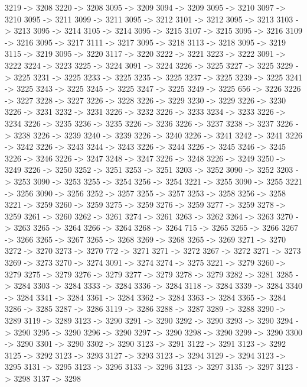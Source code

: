 {	3219 -> 3208
	3220 -> 3208
	3095 -> 3209
	3094 -> 3209
	3095 -> 3210
	3097 -> 3210
	3095 -> 3211
	3099 -> 3211
	3095 -> 3212
	3101 -> 3212
	3095 -> 3213
	3103 -> 3213
	3095 -> 3214
	3105 -> 3214
	3095 -> 3215
	3107 -> 3215
	3095 -> 3216
	3109 -> 3216
	3095 -> 3217
	3111 -> 3217
	3095 -> 3218
	3113 -> 3218
	3095 -> 3219
	3115 -> 3219
	3095 -> 3220
	3117 -> 3220
	3222 -> 3221
	3223 -> 3222
	3091 -> 3222
	3224 -> 3223
	3225 -> 3224
	3091 -> 3224
	3226 -> 3225
	3227 -> 3225
	3229 -> 3225
	3231 -> 3225
	3233 -> 3225
	3235 -> 3225
	3237 -> 3225
	3239 -> 3225
	3241 -> 3225
	3243 -> 3225
	3245 -> 3225
	3247 -> 3225
	3249 -> 3225
	656 -> 3226
	3226 -> 3227
	3228 -> 3227
	3226 -> 3228
	3226 -> 3229
	3230 -> 3229
	3226 -> 3230
	3226 -> 3231
	3232 -> 3231
	3226 -> 3232
	3226 -> 3233
	3234 -> 3233
	3226 -> 3234
	3226 -> 3235
	3236 -> 3235
	3226 -> 3236
	3226 -> 3237
	3238 -> 3237
	3226 -> 3238
	3226 -> 3239
	3240 -> 3239
	3226 -> 3240
	3226 -> 3241
	3242 -> 3241
	3226 -> 3242
	3226 -> 3243
	3244 -> 3243
	3226 -> 3244
	3226 -> 3245
	3246 -> 3245
	3226 -> 3246
	3226 -> 3247
	3248 -> 3247
	3226 -> 3248
	3226 -> 3249
	3250 -> 3249
	3226 -> 3250
	3252 -> 3251
	3253 -> 3251
	3203 -> 3252
	3090 -> 3252
	3203 -> 3253
	3090 -> 3253
	3255 -> 3254
	3256 -> 3254
	3221 -> 3255
	3090 -> 3255
	3221 -> 3256
	3090 -> 3256
	3252 -> 3257
	3255 -> 3257
	3253 -> 3258
	3256 -> 3258
	3221 -> 3259
	3260 -> 3259
	3275 -> 3259
	3276 -> 3259
	3277 -> 3259
	3278 -> 3259
	3261 -> 3260
	3262 -> 3261
	3274 -> 3261
	3263 -> 3262
	3264 -> 3263
	3270 -> 3263
	3265 -> 3264
	3266 -> 3264
	3268 -> 3264
	715 -> 3265
	3265 -> 3266
	3267 -> 3266
	3265 -> 3267
	3265 -> 3268
	3269 -> 3268
	3265 -> 3269
	3271 -> 3270
	3272 -> 3270
	3273 -> 3270
	772 -> 3271
	3271 -> 3272
	3267 -> 3272
	3271 -> 3273
	3269 -> 3273
	3270 -> 3274
	3091 -> 3274
	3274 -> 3275
	3221 -> 3279
	3260 -> 3279
	3275 -> 3279
	3276 -> 3279
	3277 -> 3279
	3278 -> 3279
	3282 -> 3281
	3285 -> 3284
	3303 -> 3284
	3333 -> 3284
	3336 -> 3284
	3118 -> 3284
	3339 -> 3284
	3340 -> 3284
	3341 -> 3284
	3361 -> 3284
	3362 -> 3284
	3363 -> 3284
	3365 -> 3284
	3286 -> 3285
	3287 -> 3286
	3119 -> 3286
	3288 -> 3287
	3289 -> 3288
	3290 -> 3289
	3119 -> 3289
	3123 -> 3290
	3291 -> 3290
	3292 -> 3290
	3293 -> 3290
	3294 -> 3290
	3295 -> 3290
	3296 -> 3290
	3297 -> 3290
	3298 -> 3290
	3299 -> 3290
	3300 -> 3290
	3301 -> 3290
	3302 -> 3290
	3123 -> 3291
	3122 -> 3291
	3123 -> 3292
	3125 -> 3292
	3123 -> 3293
	3127 -> 3293
	3123 -> 3294
	3129 -> 3294
	3123 -> 3295
	3131 -> 3295
	3123 -> 3296
	3133 -> 3296
	3123 -> 3297
	3135 -> 3297
	3123 -> 3298
	3137 -> 3298
}
